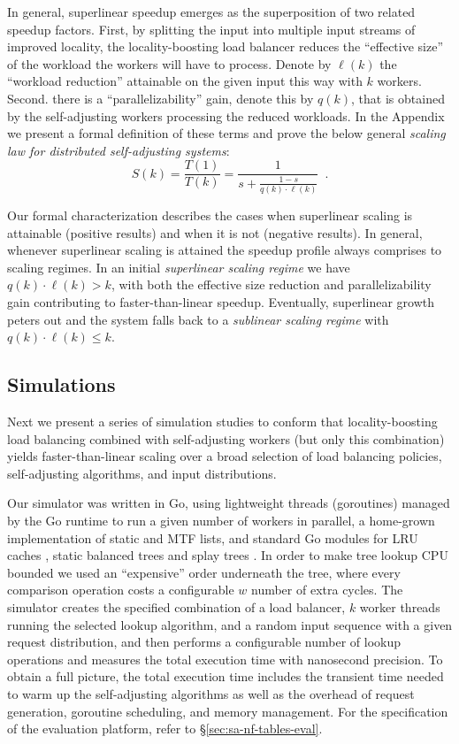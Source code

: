 In general, superlinear speedup emerges as the superposition of two related speedup factors. First, by splitting the input into multiple input streams of improved locality, the locality-boosting load balancer reduces the ``effective size'' of the workload the workers will have to process. Denote by $\ell(k)$ the ``workload reduction'' attainable on the given input this way with $k$ workers. Second. there is a ``parallelizability'' gain, denote this by $q(k)$, that is obtained by the self-adjusting workers processing the reduced workloads.  In the Appendix we present a formal definition of these terms and prove the below general \emph{scaling law for distributed self-adjusting systems}:
\begin{displaymath}
    S(k) = \frac{T(1)}{T(k)} = \frac{1}{s + \frac{1-s}{q(k) \cdot \ell(k)}} \enspace .
\end{displaymath}

Our formal characterization describes the cases when superlinear scaling is attainable (positive results) and when it is not (negative results). In general, whenever superlinear scaling is attained the speedup profile always comprises to scaling regimes. In an initial \emph{superlinear scaling regime} we have $q(k) \cdot \ell(k) > k$, with both the effective size reduction and parallelizability gain contributing to faster-than-linear speedup. Eventually, superlinear growth peters out and the system falls back to a \emph{sublinear scaling regime} with $q(k) \cdot \ell(k) \le k$.

\subsection{Simulations}
\label{sec:sims}

Next we present a series of simulation studies to conform that locality-boosting load balancing combined with self-adjusting workers (but only this combination) yields faster-than-linear scaling over a broad selection of load balancing policies, self-adjusting algorithms, and input distributions.

Our simulator was written in Go, using lightweight threads (goroutines) managed by the Go runtime to run a given number of workers in parallel, a home-grown implementation of static and MTF lists, and standard Go modules for LRU caches \cite{golang-lru}, static balanced trees \cite{golang-btree} and splay trees \cite{golang-splay}. In order to make tree lookup CPU bounded we used an ``expensive'' order underneath the tree, where every comparison operation costs a configurable $w$ number of extra cycles. The simulator creates the specified combination of a load balancer, $k$ worker threads running the selected lookup algorithm, and a random input sequence with a given request distribution, and then performs a configurable number of lookup operations and measures the total execution time with nanosecond precision. To obtain a full picture, the total execution time includes the transient time needed to warm up the self-adjusting algorithms as well as the overhead of request generation, goroutine scheduling, and memory management. For the specification of the evaluation platform, refer to \S\ref{sec:sa-nf-tables-eval}.

